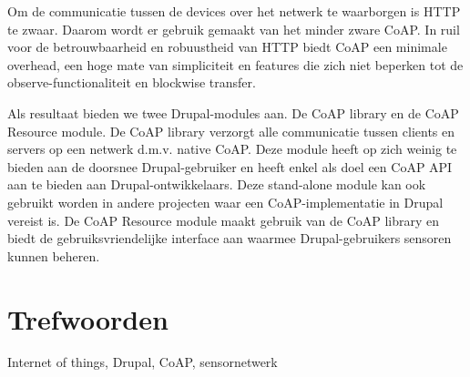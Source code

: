 {Om de communicatie tussen de devices over het netwerk te waarborgen is HTTP te zwaar. Daarom wordt er gebruik gemaakt van het minder zware CoAP. In ruil voor de betrouwbaarheid en robuustheid van HTTP biedt CoAP een minimale overhead, een hoge mate van simpliciteit en features die zich niet beperken tot de observe-functionaliteit en blockwise transfer.

Als resultaat bieden we twee Drupal-modules aan. De CoAP library en de CoAP Resource module. De CoAP library verzorgt alle communicatie tussen clients en servers op een netwerk d.m.v. native CoAP. Deze module heeft op zich weinig te bieden aan de doorsnee Drupal-gebruiker en heeft enkel als doel een CoAP API aan te bieden aan Drupal-ontwikkelaars. Deze stand-alone module kan ook gebruikt worden in andere projecten waar een CoAP-implementatie in Drupal vereist is. De CoAP Resource module maakt gebruik van de CoAP library en biedt de gebruiksvriendelijke interface aan waarmee Drupal-gebruikers sensoren kunnen beheren.




\section*{Trefwoorden}


Internet of things, Drupal, CoAP, sensornetwerk

}

\newpage %
